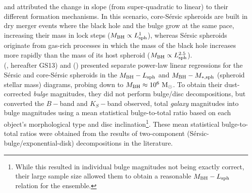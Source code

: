 \documentclass[preprint2]{emulateapj}
\begin{document}
and attributed the change in slope (from super-quadratic to linear) to their different formation mechanisms. 
In this scenario, core-S\'ersic spheroids are built in dry merger events 
where the black hole and the bulge grow at the same pace, increasing their mass in lock steps ($M_{\rm BH} \propto L_{\rm sph}^1$), 
whereas S\'ersic spheroids originate from gas-rich processes 
in which the mass of the black hole increases more rapidly than the mass of its host spheroid ($M_{\rm BH} \propto L_{\rm sph}^{2.5}$). \\
\citeauthor{grahamscott2013} (\citeyear{grahamscott2013}, hereafter GS13) and \citeauthor{scott2013} (\citeyear{scott2013}) 
presented separate power-law linear regressions 
for the S\'ersic and core-S\'ersic spheroids in the $M_{\rm BH} - L_{\rm sph}$ and $M_{\rm BH} - M_{\rm *,sph}$ 
(spheroid stellar mass) diagrams, probing down to $M_{\rm BH} \approx 10^6\rm~M_\odot$. 
To obtain their dust-corrected \emph{bulge} magnitudes, they did not perform bulge/disc decompositions, 
but converted the $B-$band and $K_S-$band observed, total \emph{galaxy} magnitudes into bulge magnitudes 
using a mean statistical bulge-to-total ratio based on each object's morphological type and disc 
inclination\footnote{While this resulted in individual bulge magnitudes not being exactly correct, 
their large sample size allowed them to obtain a reasonable $M_{\rm BH} - L_{\rm sph}$ relation for the ensemble.}. 
These mean statistical bulge-to-total ratios were obtained from the results of two-component (S\'ersic-bulge/exponential-disk) decompositions in the literature. \\
\end{document}
